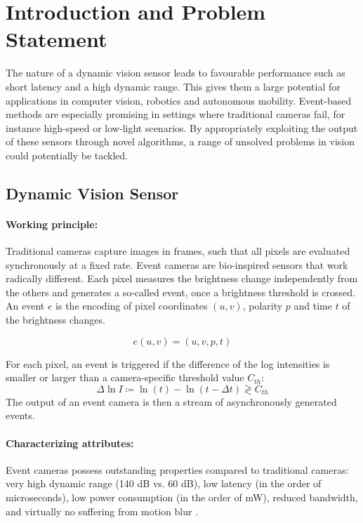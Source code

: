 \documentclass[10pt,twocolumn,letterpaper]{article}
\begin{document}
\section{Introduction and Problem Statement}

The nature of a dynamic vision sensor leads to favourable performance such as short latency and a high dynamic range. This gives them a large potential for applications in computer vision, robotics and autonomous mobility. Event-based methods are especially promising in settings where traditional cameras fail, for instance high-speed or low-light scenarios. By appropriately exploiting the output of these sensors through novel algorithms, a range of unsolved problems in vision could potentially be tackled. 

\subsection{Dynamic Vision Sensor}

\paragraph{Working principle:}
Traditional cameras capture images in frames, such that all pixels are evaluated synchronously at a fixed rate. Event cameras are bio-inspired sensors that work radically different. 
Each pixel measures the brightness change independently from the others and generates a so-called event, once a brightness threshold is crossed. An event $e$ is the encoding of pixel coordinates $(u,v)$, polarity $p$ and time $t$ of the brightness changes.

\begin{equation}
e(u,v) = (u,v,p,t)
\end{equation}

For each pixel, an event is triggered if the difference of the log intensities is smaller or larger than a camera-specific threshold value $C_{th}$:
\begin{equation}
    \Delta \ln{I} \coloneqq \ln{(t)} - \ln{(t-\Delta t) \gtrless
C_{th} } 
\end{equation}
The output of an event camera is then a stream of asynchronously generated events. 

\paragraph{Characterizing attributes:}
Event cameras possess outstanding properties compared to traditional cameras: very high dynamic range (140 dB vs. 60 dB), low latency (in the order of microseconds), low power consumption (in the order of mW), reduced bandwidth, and virtually no suffering from motion blur \cite{EventVisionReview}.
\end{document}
